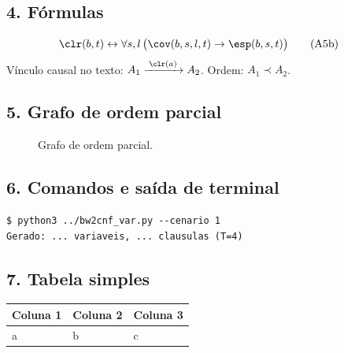 \subsection*{4. Fórmulas}
\begin{align}
&\clr(b,t) \leftrightarrow \forall s,l\,\bigl(\cov(b,s,l,t)\rightarrow
  \esp(b,s,t)\bigr) \tag{A5b}
\end{align}
Vínculo causal no texto: $A_1\xrightarrow{\;\clr(a)\;}A_2$. Ordem: $A_1\prec A_2$.

\subsection*{5. Grafo de ordem parcial}
\begin{figure}[H]
\centering
{}
\caption{Grafo de ordem parcial.}
\end{figure}

\subsection*{6. Comandos e saída de terminal}
\begin{lstlisting}
$ python3 ../bw2cnf_var.py --cenario 1
Gerado: ... variaveis, ... clausulas (T=4)
\end{lstlisting}

\subsection*{7. Tabela simples}
\begin{center}\small
\begin{tabular}{@{}lll@{}}
\toprule
Coluna 1 & Coluna 2 & Coluna 3\\
\midrule
a & b & c\\
\bottomrule
\end{tabular}
\end{center}
